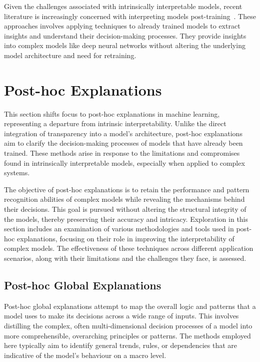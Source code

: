  
Given the challenges associated with intrinsically interpretable models, recent literature is increasingly concerned with interpreting models post-training~\cite{MarkusKR21}. These approaches involves applying techniques to already trained models to extract insights and understand their decision-making processes. They provide insights into complex models like deep neural networks without altering the underlying model architecture and need for retraining.

\section{Post-hoc Explanations}
\label{sec:post-hoc}

This section shifts focus to post-hoc explanations in machine learning, representing a departure from intrinsic interpretability. Unlike the direct integration of transparency into a model's architecture, post-hoc explanations aim to clarify the decision-making processes of models that have already been trained. These methods arise in response to the limitations and compromises found in intrinsically interpretable models, especially when applied to complex systems.

The objective of post-hoc explanations is to retain the performance and pattern recognition abilities of complex models while revealing the mechanisms behind their decisions. This goal is pursued without altering the structural integrity of the models, thereby preserving their accuracy and intricacy. Exploration in this section includes an examination of various methodologies and tools used in post-hoc explanations, focusing on their role in improving the interpretability of complex models. The effectiveness of these techniques across different application scenarios, along with their limitations and the challenges they face, is assessed.


\subsection{Post-hoc Global Explanations}
\label{section:postglobal}

Post-hoc global explanations attempt to map the overall logic and patterns that a model uses to make its decisions across a wide range of inputs. This involves distilling the complex, often multi-dimensional decision processes of a model into more comprehensible, overarching principles or patterns. The methods employed here typically aim to identify general trends, rules, or dependencies that are indicative of the model's behaviour on a macro level.

